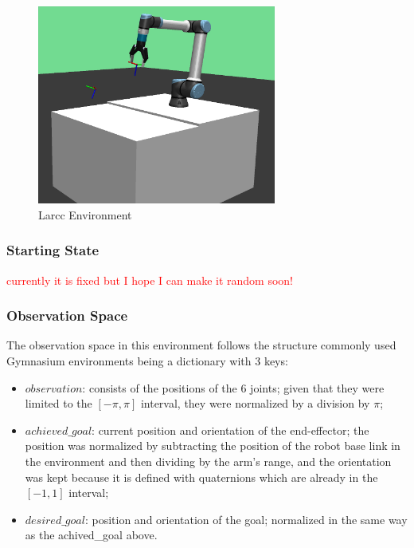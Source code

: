\begin{figure}[H]%
    \centerline{\includegraphics[width=0.7\textwidth]{figs/larcc_env.png}}
    \caption[Larcc Environment]{Larcc Environment}
    \label{fig:larcc_env}
\end{figure}

\subsubsection{Starting State}

\textcolor{red}{currently it is fixed but I hope I can make it random soon!}

\subsubsection{Observation Space}

The observation space in this environment follows the structure commonly used Gymnasium environments being a dictionary with 3 keys:

\begin{itemize}
    \item $observation$: consists of the positions of the 6 joints; given that they were limited to the $[-\pi, \pi]$ interval, they were normalized by a division by $\pi$;
    \item $achieved\_goal$: current position and orientation of the end-effector; the position was normalized by subtracting the position of the robot base link in the environment and then dividing by the arm's range, and the orientation was kept because it is defined with quaternions which are already in the $[-1, 1]$ interval;
    \item $desired\_goal$: position and orientation of the goal; normalized in the same way as the achived\_goal above.
\end{itemize}

